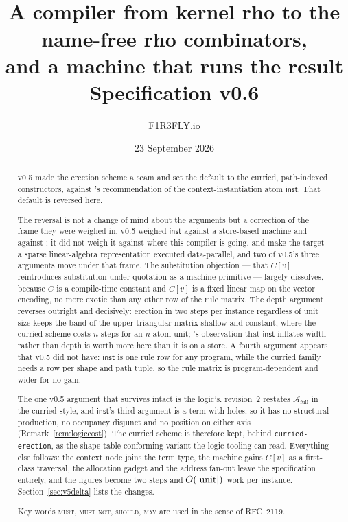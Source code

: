 \documentclass[11pt,a4paper]{article}
\title{\textbf{\Comb}\\[1mm]
\large A compiler from kernel rho to the name-free rho combinators,\\
and a machine that runs the result\\[2mm]
\normalsize Specification v0.6}
\author{F1R3FLY.io}
\date{23 September 2026}
\newcommand{\code}[1]{\texttt{#1}}
\newcommand{\MUST}{\textsc{must}}
\newcommand{\MUSTNOT}{\textsc{must not}}
\newcommand{\SHOULD}{\textsc{should}}
\newcommand{\MAY}{\textsc{may}}
\newcommand{\Atm}{\mathcal{A}}
\newcommand{\inst}{\mathsf{inst}}
\theoremstyle{definition}
\theoremstyle{plain}
\begin{document}
\maketitle

\begin{abstract}
\noindent
v0.5 made the erection scheme a seam and set the default to the curried,
path-indexed constructors, against \cite[Rem.~6.22]{draft3}'s recommendation
of the context-instantiation atom $\inst$. That default is reversed here.

The reversal is not a change of mind about the arguments but a correction of
the frame they were weighed in. v0.5 weighed $\inst$ against a store-based
machine and against \cite{logic}; it did not weigh it against where this
compiler is going. \cite{matrix} and \cite{matspec} make the target a sparse
linear-algebra representation executed data-parallel, and two of v0.5's three
arguments move under that frame. The substitution objection --- that
$C[v]$ reintroduces substitution under quotation as a machine primitive ---
largely dissolves, because $C$ is a compile-time constant and $C[v]$ is a
fixed linear map on the vector encoding, no more exotic than any other row of
the rule matrix. The depth argument reverses outright and decisively: erection
in two steps per instance regardless of unit size keeps the band of the
upper-triangular matrix shallow and constant, where the curried scheme costs
$n$ steps for an $n$-atom unit; \cite[Rem.~6.22]{draft3}'s observation that
$\inst$ inflates width rather than depth is worth more here than it is on a
store. A fourth argument appears that v0.5 did not have: $\inst$ is one rule
row for any program, while the curried family needs a row per shape and path
tuple, so the rule matrix is program-dependent and wider for no gain.

The one v0.5 argument that survives intact is the logic's.
\cite{logic} revision~2 restates $\Atm_{\mathrm{full}}$ in the curried style,
and $\inst$'s third argument is a term with holes, so it has no structural
production, no occupancy disjunct and no position on either axis
(Remark~\ref{rem:logiccost}). The curried scheme is therefore kept, behind
\code{curried-erection}, as the shape-table-conforming variant the logic
tooling can read. Everything else follows: the context node joins the term
type, the machine gains $C[v]$ as a first-class traversal, the allocation
gadget and the address fan-out leave the specification entirely, and the
figures become two steps and $O(|{\rm unit}|)$ work per instance.
Section~\ref{sec:v5delta} lists the changes.

Key words \MUST, \MUSTNOT, \SHOULD, \MAY{} are used in the sense of RFC~2119.
\end{abstract}
\end{document}
